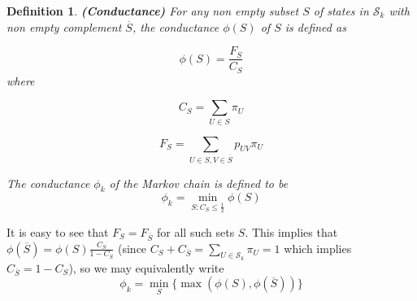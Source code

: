 \documentclass{sig-alternate-2013}
\newtheorem{definition}[theorem]{Definition}
\begin{document}
\begin{definition}{\bf(Conductance)\cite{alistair}}
  For any non empty subset $S$ of states in $\mathcal{S}_k$ with non
  empty complement $\overline{S}$, the \emph{conductance} $\phi(S)$ of
  $S$ is defined as 
  
  \[ 
  \phi(S) = \frac{F_S}{C_S}
  \] where

  \[
    C_S=\sum_{U \in S} \pi_U
  \]

  \[  F_S=\sum_{U\in S, V \in \overline{S}}p_{UV}\pi_U \]

  The \emph{conductance} $\phi_k$ of the Markov chain is defined to be
 \[   \phi_k = \min_{S: C_S \leq \frac{1}{2}} \phi(S)  \]
\end{definition}


It is easy to see that $F_S=F_{\overline{S}}$ for all such sets $S$.
This implies that $\phi(\overline{S}) = \phi(S) \frac{C_S}{1-C_S}$ (since 
$C_S + C_{\overline{S}} = \sum_{U \in \mathcal{S}_k} \pi_U = 1$ which implies
$C_{\overline{S}} = 1 - C_S$), so
we may equivalently write
 \[ \phi_k = \min_{S} \{\max(\phi(S), \phi(\overline{S}))\} \]
\end{document}
